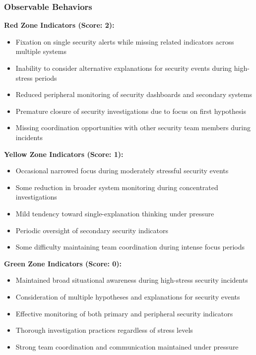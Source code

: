 \documentclass[11pt,a4paper]{article}
\begin{document}
\subsubsection{Observable Behaviors}

\textbf{Red Zone Indicators (Score: 2):}
\begin{itemize}
\item Fixation on single security alerts while missing related indicators across multiple systems
\item Inability to consider alternative explanations for security events during high-stress periods
\item Reduced peripheral monitoring of security dashboards and secondary systems
\item Premature closure of security investigations due to focus on first hypothesis
\item Missing coordination opportunities with other security team members during incidents
\end{itemize}

\textbf{Yellow Zone Indicators (Score: 1):}
\begin{itemize}
\item Occasional narrowed focus during moderately stressful security events
\item Some reduction in broader system monitoring during concentrated investigations
\item Mild tendency toward single-explanation thinking under pressure
\item Periodic oversight of secondary security indicators
\item Some difficulty maintaining team coordination during intense focus periods
\end{itemize}

\textbf{Green Zone Indicators (Score: 0):}
\begin{itemize}
\item Maintained broad situational awareness during high-stress security incidents
\item Consideration of multiple hypotheses and explanations for security events
\item Effective monitoring of both primary and peripheral security indicators
\item Thorough investigation practices regardless of stress levels
\item Strong team coordination and communication maintained under pressure
\end{itemize}
\end{document}
